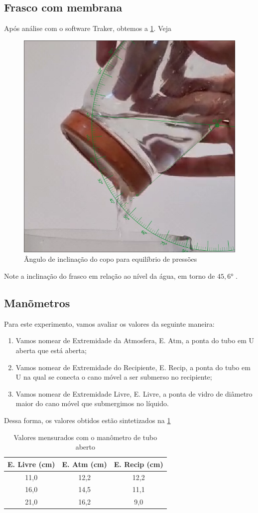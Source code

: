 \subsection{Frasco com membrana}

Após análise com o software Traker, obtemos a \cref{copo.png}. Veja

\begin{figure}[H]
    \centering
    \includegraphics[width=.5\linewidth]{fig/copo.png}
    \caption{Ângulo de inclinação do copo para equilíbrio de pressões}
    \label{copo.png}
\end{figure}

Note a inclinação do frasco em relação ao nível da água, em torno de \( 45,6 \)° .

\subsection{Manõmetros}

Para este experimento, vamos avaliar os valores da seguinte maneira:
\begin{enumerate}
    \item Vamos nomear de Extremidade da Atmosfera, E. Atm, a ponta do tubo em U aberta que está aberta;
    \item Vamos nomear de Extremidade do Recipiente, E. Recip, a ponta do tubo em U na qual se conecta o cano móvel a ser submerso no recipiente;
    \item Vamos nomear de Extremidade Livre, E. Livre, a ponta de vidro de diâmetro maior do cano móvel que submergimos no líquido.
\end{enumerate}

Dessa forma, os valores obtidos estão sintetizados na \cref{tab_man}

\begin{table}[H]
    \centering
    \begin{tabular}{c | c | c}
        \hline
        \textbf{E. Livre (cm)} & \textbf{E. Atm (cm)} & \textbf{E. Recip (cm)}\\
        \hline
        11,0 & 12,2 & 12,2\\
        \hline
        16,0 & 14,5 & 11,1\\
        \hline
        21,0 & 16,2 & 9,0\\
        \hline
    \end{tabular}
    \caption{Valores mensurados com o manômetro de tubo aberto}
    \label{tab_man}
\end{table}